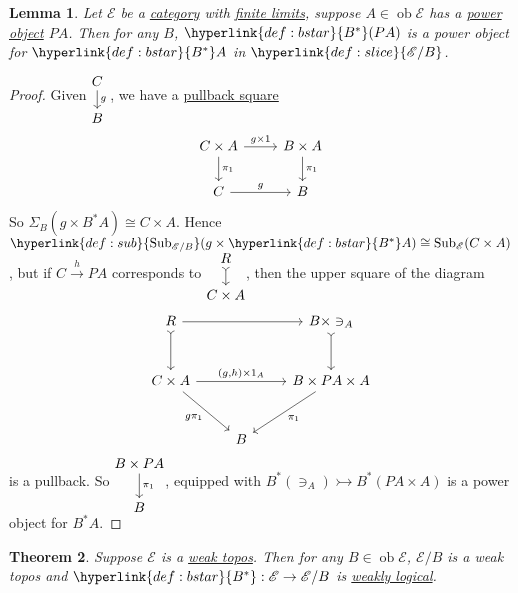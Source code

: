 \documentclass{article}
\DeclareMathOperator{\ob}{ob}
\DeclareMathOperator{\Sub}{Sub}
\newenvironment{tikzcdi}{\begin{tikzcd}[cramped, sep=scriptsize]}{\end{tikzcd}}
\newtheorem{nthm}{Theorem}[section]
\newtheorem{nlemma}[nthm]{Lemma}
\begin{document}
\begin{nlemma}\label{lem:7.11}
  Let $\mathscr{E}$ be a \hyperlink{def:cat}{category} with \hyperlink{def:limit}{finite limits}, suppose $A \in \ob \mathscr{E}$ has a \hyperlink{def:power}{power object} $PA$.
  Then for any $B$, $\hyperlink{def:bstar}{B^*}(PA)$ is a power object for $\hyperlink{def:bstar}{B^*}A$ in $\hyperlink{def:slice}{\mathscr{E}/B}$.
\end{nlemma}
\begin{proof}
  Given $\begin{tikzcdi}C \dar{g}\\B\end{tikzcdi}$, we have a \hyperlink{def:pullback}{pullback square}
  \begin{equation*}
    \begin{tikzcd}
      C \times A \rar{g \times 1} \dar{\pi_1} & B \times A \dar{\pi_1} \\
      C \rar{g} & B
    \end{tikzcd}
  \end{equation*}
  So $\Sigma_B(g \times B^* A) \cong C \times A$.
  Hence $\hyperlink{def:sub}{\Sub_{\mathscr{E}/B}} (g \times \hyperlink{def:bstar}{B^*} A) \cong \Sub_{\mathscr{E}} (C \times A)$, but if $C \xrightarrow{h} PA$ corresponds to $\begin{tikzcdi} R \dar[tail] \\ C \times A \end{tikzcdi}$, then the upper square of the diagram
  \begin{equation*}
    \begin{tikzcd}[row sep=large]
      R \ar[d, tail] \arrow[rr]  && B \times \ni_A \ar[d, tail] \\
      C \times A \arrow[rr, "{(g,h)} \times 1_A"] \arrow[dr, "g \pi_1"']&& B \times PA \times A \arrow[dl, "\pi_1"]\\
                                          & B
    \end{tikzcd}
  \end{equation*}
  is a pullback.
  So $\begin{tikzcd}[cramped] B \times PA \dar{\pi_1} \\ B\end{tikzcd}$, equipped with $B^*(\ni_A) \rightarrowtail B^*(PA \times A)$ is a power object for $B^* A$.
\end{proof}
\begin{nthm}\label{cor:7.12}
  Suppose $\mathscr{E}$ is a \hyperlink{def:wtopos}{weak topos}.
  Then for any $B \in \ob \mathscr{E}$, \hyperlink{def:slice}{$\mathscr{E}/B$} is a weak topos and $\hyperlink{def:bstar}{B^*}: \mathscr{E} \to \mathscr{E}/B$ is \hyperlink{def:lFunct}{weakly logical}.
\end{nthm}
\end{document}
